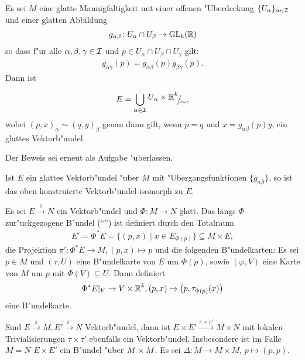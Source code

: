 \begin{Satz}\label{satz-5-2}
  Es sei $M$ eine glatte Mannigfaltigkeit mit einer offenen "Uberdeckung $\{U_{\alpha}\}_{\alpha \in \operatorname{\mathcal{I}}}$ und einer glatten Abbildung
  \begin{align*}
    g_{\alpha\beta} \colon U_{\alpha} \cap U_{\beta} \to \operatorname{GL}_k(\operatorname{\mathbb{R}})
  \end{align*}
so dass f"ur alle $\alpha,\beta,\gamma \in \operatorname{\mathcal{I}}$ und $p \in U_{\alpha} \cap U_{\beta} \cap U_{\gamma}$ gilt:
\begin{align*}
  g_{\alpha\gamma} (p) = g_{\alpha\beta}(p)g_{\beta\gamma}(p).
\end{align*}
Dann ist
	\[ E = \bigcup_{\alpha \in \calI}^{\cdot} \FakRaum{U_{\alpha} \times \R^k}{\sim}, \]
wobei $(p,x)_{\alpha} \sim (q,y)_{\beta}$ genau dann gilt, wenn $p = q$ und $x = g_{\alpha\beta}(p)y$, ein glattes Vektorb"undel.
\end{Satz}

Der Beweis sei erneut als Aufgabe "uberlassen.

\begin{kor}
  Ist $E$ ein glattes Vektorb"undel "uber $M$ mit "Ubergangsfunktionen $\{g_{\alpha\beta}\}$, so ist das oben konstruierte Vektorb"undel isomorph zu $E$.
\end{kor}

Es sei $E \xrightarrow{\pi} N$ ein Vektorb"undel und $\Phi \colon M \to N$ glatt.
Das längs $\Phi$ zur"uckgezogene B"undel ("`"') ist definiert durch den Totalraum
\begin{align*}
  E' = \Phi^{\ast}E = \{(p,x) \mid x \in E_{\Phi(p)}\} \subseteq M \times E,
\end{align*}
die Projektion $\pi' \colon \Phi^{\ast}E \to M, (p,x) \mapsto p$ und die folgenden B"undelkarten:
Es sei $p \in M$ und $(\tau, U)$ eine B"undelkarte von $E$ um $\Phi(p)$, sowie $(\varphi,V)$ eine Karte von $M$ um $p$ mit $\Phi(V) \subseteq U$.
Dann definiert 
\begin{align*}
  \Phi^{\ast}E|_V \to V \times \operatorname{\mathbb{R}}^k, (p,x) \mapsto \left(p, \tau_{\Phi(p)}(x)\right)
\end{align*}
eine B"undelkarte.

Sind $E \xrightarrow{\pi} M, E' \xrightarrow{\pi'} N$ Vektorb"undel, dann ist $E \times E' \xrightarrow{\pi \times \pi'} M \times N$ mit lokalen Trivialisierungen $\tau \times \tau'$ ebenfalls ein Vektorb"undel.
Insbesondere ist im Falle $M = N$ $E \times E'$ ein B"undel "uber $M \times M$.
Es sei $\Delta \colon M \to M \times M$, $p \mapsto (p,p)$.

